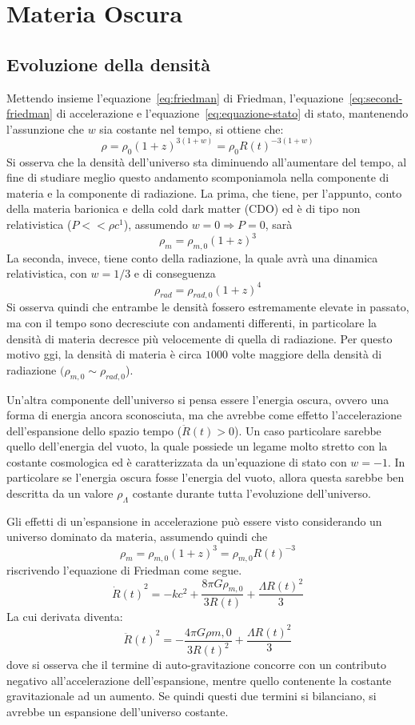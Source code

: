 \section{Materia Oscura}\label{sec:materia-oscura}
\subsection{Evoluzione della densità}\label{sec:evoluazione-densita}
Mettendo insieme l'equazione~\ref{eq:friedman} di Friedman, l'equazione~\ref{eq:second-friedman} di accelerazione e l'equazione~\ref{eq:equazione-stato} di stato, mantenendo l'assunzione che $w$ sia costante nel tempo, si ottiene che:
\[
    \rho = \rho_0 {(1+z)}^{3(1+w)} = \rho_0 {R(t)}^{-3(1+w)}
\]
Si osserva che la densità dell'universo sta diminuendo all'aumentare del tempo, al fine di studiare meglio questo andamento scomponiamola nella componente di materia e la componente di radiazione. La prima, che tiene, per l'appunto, conto della materia barionica e della cold dark matter (CDO) ed è di tipo non relativistica ($P<<\rho c^1$), assumendo $w = 0 \Rightarrow P=0$, sarà
\[
    \rho_m = \rho_{m,0}{(1+z)}^3
\]
La seconda, invece, tiene conto della radiazione, la quale avrà una dinamica relativistica, con $w = 1/3$ e di conseguenza
\[
    \rho_{rad} = \rho_{rad, 0}{(1+z)}^4
\]
Si osserva quindi che entrambe le densità fossero estremamente elevate in passato, ma con il tempo sono decresciute con andamenti differenti, in particolare la densità di materia decresce più velocemente di quella di radiazione. Per questo motivo ggi, la densità di materia è circa $1000$ volte maggiore della densità di radiazione $(\rho_{m,0} \sim \rho_{rad, 0}$).

Un'altra componente dell'universo si pensa essere l'energia oscura, ovvero una forma di energia ancora sconosciuta, ma che avrebbe come effetto l'accelerazione dell'espansione dello spazio tempo ($\ddot{R}(t)>0$). Un caso particolare sarebbe quello dell'energia del vuoto, la quale possiede un legame molto stretto con la costante cosmologica ed è caratterizzata da un'equazione di stato con $w = -1$. In particolare se l'energia oscura fosse l'energia del vuoto, allora questa sarebbe ben descritta da un valore $\rho_{\Lambda}$ costante durante tutta l'evoluzione dell'universo.

Gli effetti di un'espansione in accelerazione può essere visto considerando un universo dominato da materia, assumendo quindi che
\[
    \rho_{m} = \rho_{m, 0}{(1+z)}^3 = \rho_{m,0}{R(t)}^{-3}
\]
riscrivendo l'equazione di Friedman come segue.
\[
    {\dot{R}(t)}^2 = - kc^2 + \frac{8\pi G \rho_{m,0}}{3R(t)} + \frac{\Lambda {R(t)}^2}{3}
\]
La cui derivata diventa:
\[
    {\ddot{R}(t)}^2 = -\frac{4\pi G \rho{m,0}}{3{R(t)}^2}+ \frac{\Lambda {R(t)}^2}{3}
\]
dove si osserva che il termine di auto-gravitazione concorre con un contributo negativo all'accelerazione dell'espansione, mentre quello contenente la costante gravitazionale ad un aumento. Se quindi questi due termini si bilanciano, si avrebbe un espansione dell'universo costante.

